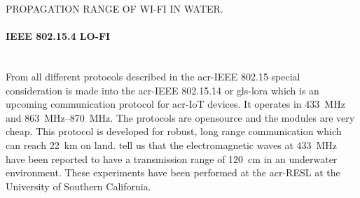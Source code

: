 \begin{RoyalFigure}[!htb, label=fig:propagationrange_wifi]{PROPAGATION RANGE OF WI-FI IN WATER.}
\end{RoyalFigure}

\paragraph{IEEE 802.15.4 LO-FI} \hfill \\
From all different protocols described in the \gls{acr-IEEE} 802.15 special consideration is made into the 
\gls{acr-IEEE} 802.15.14 or \gls{gls-lora} which is an upcoming communication protocol for \gls{acr-IoT} devices. It 
operates in \SI{433}{\mega\hertz} and \SIrange{863}{870}{\mega\hertz}. The protocols are opensource and the modules 
are very cheap. This protocol is developed for robust, long range communication which can reach \SI{22}{\kilo\meter} 
on land. \citet{akyildiz_underwater_2005} tell us that the electromagnetic waves at \SI{433}{\mega\hertz} have been 
reported to have a transmission range of \SI{120}{\cm} in an underwater environment. These experiments have been 
performed at the \gls{acr-RESL} at the University of Southern California.

